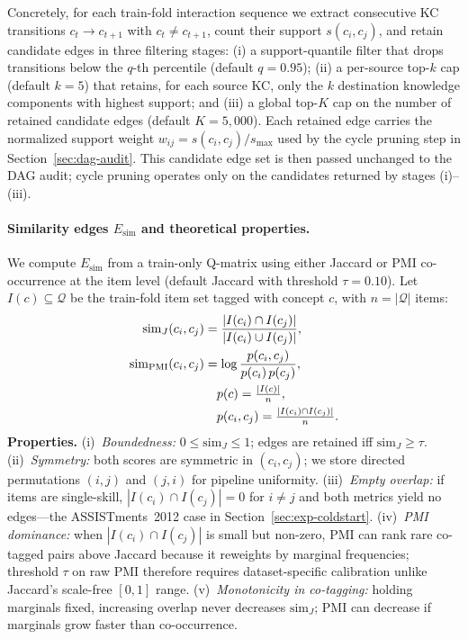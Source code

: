 \documentclass[pdflatex,sn-basic]{sn-jnl}
\newcommand{\Esim}{\ensuremath{E_{\text{sim}}}}
\newcommand{\KCs}{knowledge components}
\begin{document}
Concretely, for each train-fold interaction sequence we extract
consecutive KC transitions $c_{t} \rightarrow c_{t+1}$ with
$c_{t} \neq c_{t+1}$, count their support $s(c_i, c_j)$, and retain
candidate edges in three filtering stages:
(i) a support-quantile filter that drops transitions below the
$q$-th percentile (default $q = 0.95$);
(ii) a per-source top-$k$ cap (default $k = 5$) that retains, for each
source KC, only the $k$ destination \KCs{} with highest support; and
(iii) a global top-$K$ cap on the number of retained candidate edges
(default $K = 5{,}000$). Each retained edge carries the normalized
support weight $w_{ij} = s(c_i, c_j) / s_{\max}$ used by the cycle
pruning step in Section~\ref{sec:dag-audit}. This candidate edge set
is then passed unchanged to the DAG audit; cycle pruning operates only
on the candidates returned by stages (i)--(iii).

\paragraph{Similarity edges $\Esim$ and theoretical properties.}
\label{sec:graph-sim-theory}
We compute $\Esim$ from a train-only Q-matrix using either Jaccard or
PMI co-occurrence at the item level (default Jaccard with threshold
$\tau{=}0.10$). Let $I(c)\subseteq\mathcal{Q}$ be the train-fold item
set tagged with concept $c$, with $n=|\mathcal{Q}|$ items:
\begin{align}
\mathrm{sim}_J(c_i,c_j) &=
  \frac{|I(c_i)\cap I(c_j)|}{|I(c_i)\cup I(c_j)|},
  \label{eq:sim-jaccard}\\
\mathrm{sim}_{\mathrm{PMI}}(c_i,c_j) &=
  \log \frac{p(c_i,c_j)}{p(c_i)\,p(c_j)},
  \label{eq:sim-pmi}\notag\\
&\quad p(c)=\tfrac{|I(c)|}{n},\notag\\
&\quad p(c_i,c_j)=\tfrac{|I(c_i)\cap I(c_j)|}{n}.
\end{align}
\textbf{Properties.}
(i)~\emph{Boundedness:} $0\le \mathrm{sim}_J\le 1$; edges are retained
iff $\mathrm{sim}_J\ge\tau$.
(ii)~\emph{Symmetry:} both scores are symmetric in $(c_i,c_j)$; we store
directed permutations $(i,j)$ and $(j,i)$ for pipeline uniformity.
(iii)~\emph{Empty overlap:} if items are single-skill,
$|I(c_i)\cap I(c_j)|=0$ for $i\neq j$ and both metrics yield no edges---the
ASSISTments~2012 case in Section~\ref{sec:exp-coldstart}.
(iv)~\emph{PMI dominance:} when $|I(c_i)\cap I(c_j)|$ is small but
non-zero, PMI can rank rare co-tagged pairs above Jaccard because it
reweights by marginal frequencies; threshold $\tau$ on raw PMI therefore
requires dataset-specific calibration unlike Jaccard's scale-free
$[0,1]$ range.
(v)~\emph{Monotonicity in co-tagging:} holding marginals fixed,
increasing overlap never decreases $\mathrm{sim}_J$; PMI can decrease if
marginals grow faster than co-occurrence.
\end{document}
